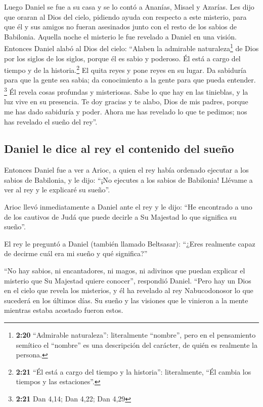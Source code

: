 Luego Daniel se fue a su casa y se lo contó a Ananías,
Misael y Azarías.  Les dijo que oraran al Dios del cielo,
pidiendo ayuda con respecto a este misterio, para que él y sus amigos no
fueran asesinados junto con el resto de los sabios de Babilonia.
 Aquella noche el misterio le fue revelado a Daniel en
una visión. Entonces Daniel alabó al Dios del cielo: 
``Alaben la admirable naturaleza\footnote{\textbf{2:20} ``Admirable
  naturaleza'': literalmente ``nombre'', pero en el pensamiento semítico
  el ``nombre'' es una descripción del carácter, de quién es realmente
  la persona.} de Dios por los siglos de los siglos, porque él es sabio
y poderoso.  Él está a cargo del tiempo y de la
historia.\footnote{\textbf{2:21} ``Él está a cargo del tiempo y la
  historia'': literalmente, ``Él cambia los tiempos y las estaciones''.}
El quita reyes y pone reyes en su lugar. Da sabiduría para que la gente
sea sabia; da conocimiento a la gente para que pueda entender.
\footnote{\textbf{2:21} Dan 4,14; Dan 4,22; Dan 4,29}  Él
revela cosas profundas y misteriosas. Sabe lo que hay en las tinieblas,
y la luz vive en su presencia.  Te doy gracias y te
alabo, Dios de mis padres, porque me has dado sabiduría y poder. Ahora
me has revelado lo que te pedimos; nos has revelado el sueño del rey''.

\hypertarget{daniel-le-dice-al-rey-el-contenido-del-sueuxf1o}{%
\subsection{Daniel le dice al rey el contenido del
sueño}\label{daniel-le-dice-al-rey-el-contenido-del-sueuxf1o}}

 Entonces Daniel fue a ver a Arioc, a quien el rey había
ordenado ejecutar a los sabios de Babilonia, y le dijo: ``¡No ejecutes a
los sabios de Babilonia! Llévame a ver al rey y le explicaré su sueño''.

 Arioc llevó inmediatamente a Daniel ante el rey y le
dijo: ``He encontrado a uno de los cautivos de Judá que puede decirle a
Su Majestad lo que significa su sueño''.

 El rey le preguntó a Daniel (también llamado Beltsasar):
``¿Eres realmente capaz de decirme cuál era mi sueño y qué significa?''

 ``No hay sabios, ni encantadores, ni magos, ni adivinos
que puedan explicar el misterio que Su Majestad quiere conocer'',
respondió Daniel.  ``Pero hay un Dios en el cielo que
revela los misterios, y él ha revelado al rey Nabucodonosor lo que
sucederá en los últimos días. Su sueño y las visiones que le vinieron a
la mente mientras estaba acostado fueron estos.

